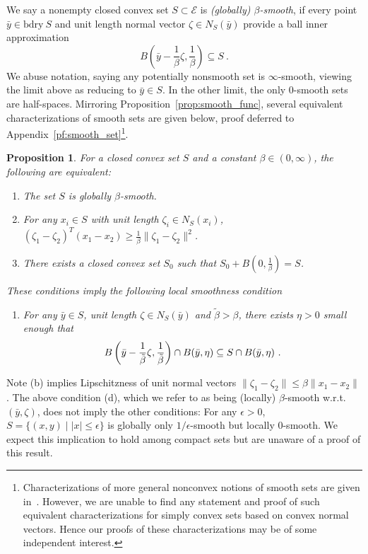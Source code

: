 \documentclass[sn-mathphys,Numbered]{sn-jnl}%
\newcommand{\bdry}{\mathrm{bdry\ }}
\newtheorem{proposition}[theorem]{Proposition}%
\begin{document}
We say a nonempty closed convex set $S\subset \mathcal{E}$ is {\it (globally) $\beta$-smooth}, if every point $\bar y\in\bdry S$ and unit length normal vector $\zeta\in N_S(\bar y)$ provide a ball inner approximation
\begin{equation} \label{eq:inner-ball}
    B\left(\bar y - \frac{1}{\beta}\zeta, \frac{1}{\beta}\right) \subseteq S \ .
\end{equation}
We abuse notation, saying any potentially nonsmooth set is $\infty$-smooth, viewing the limit above as reducing to $\bar y \in S$. In the other limit, the only $0$-smooth sets are half-spaces.
Mirroring Proposition~\ref{prop:smooth_func}, several equivalent characterizations of smooth sets are given below, proof deferred to Appendix~\ref{pf:smooth_set}\footnote{Characterizations of more general nonconvex notions of smooth sets are given in~\cite[Definition 3.2, Page 286]{goncharov2017strong}. However, we are unable to find any statement and proof of such equivalent characterizations for simply convex sets based on convex normal vectors. Hence our proofs of these characterizations may be of some independent interest.}.
\begin{proposition} \label{prop:smooth_set}
    For a closed convex set $S$ and a constant $\beta\in (0,\infty)$, the following are equivalent:
    \begin{enumerate}[label=(\alph*)]
    \item The set $S$ is globally $\beta$-smooth.
    \item For any $x_i \in S$ with unit length $\zeta_i \in N_S(x_i)$, $ (\zeta_1-\zeta_2)^T(x_1-x_2)\geq \frac{1}{\beta}\|\zeta_1-\zeta_2\|^2 $.
    \item There exists a closed convex set $S_0$ such that  $S_0+B(0, \frac{1}{\beta})=S$.
    \end{enumerate}
    These conditions imply the following local smoothness condition
    \begin{enumerate}
    \item[(d)] For any $\bar y\in S$, unit length $\zeta\in N_S(\bar y)$ and $\tilde \beta > \beta$, there exists $\eta>0$ small enough that $$ B\left(\bar y - \frac{1}{\Tilde{\beta}}\zeta, \frac{1}{\Tilde{\beta}}\right) \cap B(\bar y, \eta) \subseteq S \cap B(\bar y, \eta) \ . $$ 
    \end{enumerate}
\end{proposition}


\noindent Note (b) implies Lipschitzness of unit normal vectors $\|\zeta_1-\zeta_2\| \leq \beta\|x_1-x_2\|$. The above condition (d), which we refer to as being (locally) $\beta$-smooth w.r.t.~$(\bar y, \zeta)$, does not imply the other conditions: For any $\epsilon>0$, $S=\{(x,y) \mid |x| \leq \epsilon \}$ is globally only $1/\epsilon$-smooth but locally $0$-smooth. We expect this implication to hold among compact sets but are unaware of a proof of this result.
\end{document}

